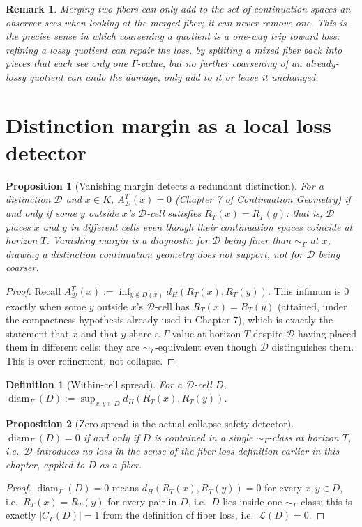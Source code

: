 \documentclass[11pt]{report}
\newtheorem{proposition}{Proposition}[chapter]
\newtheorem{definition}{Definition}[chapter]
\newtheorem{remark}{Remark}[chapter]
\begin{document}
\begin{remark}
Merging two fibers can only add to the set of continuation spaces an
observer sees when looking at the merged fiber; it can never remove
one. This is the precise sense in which coarsening a quotient is a
one-way trip toward loss: refining a lossy quotient can repair the
loss, by splitting a mixed fiber back into pieces that each see only
one $\Gamma$-value, but no further coarsening of an already-lossy
quotient can undo the damage, only add to it or leave it unchanged.
\end{remark}

\section*{Distinction margin as a local loss detector}

\begin{proposition}[Vanishing margin detects a redundant distinction]
For a distinction $\mathcal{D}$ and $x \in K$, $A_{\mathcal D}^T(x) = 0$
(Chapter 7 of \emph{Continuation Geometry}) if and only if some $y$
outside $x$'s $\mathcal{D}$-cell satisfies $R_T(x) = R_T(y)$: that is,
$\mathcal{D}$ places $x$ and $y$ in different cells even though their
continuation spaces coincide at horizon $T$. Vanishing margin is a
diagnostic for $\mathcal{D}$ being \emph{finer} than $\sim_\Gamma$ at
$x$, drawing a distinction continuation geometry does not support, not
for $\mathcal{D}$ being coarser.
\end{proposition}
\begin{proof}
Recall $A_{\mathcal D}^T(x) := \inf_{y \notin D(x)} d_H(R_T(x), R_T(y))$.
This infimum is $0$ exactly when some $y$ outside $x$'s
$\mathcal{D}$-cell has $R_T(x) = R_T(y)$ (attained, under the
compactness hypothesis already used in Chapter 7), which is exactly
the statement that $x$ and that $y$ share a $\Gamma$-value at horizon
$T$ despite $\mathcal D$ having placed them in different cells: they
are $\sim_\Gamma$-equivalent even though $\mathcal D$ distinguishes
them. This is over-refinement, not collapse.
\end{proof}

\begin{definition}[Within-cell spread]
For a $\mathcal{D}$-cell $D$, $\operatorname{diam}_\Gamma(D) :=
\sup_{x,y \in D} d_H(R_T(x), R_T(y))$.
\end{definition}

\begin{proposition}[Zero spread is the actual collapse-safety detector]
\label{prop:diamzero}
$\operatorname{diam}_\Gamma(D) = 0$ if and only if $D$ is contained in
a single $\sim_\Gamma$-class at horizon $T$, i.e.\ $\mathcal{D}$
introduces no loss in the sense of the fiber-loss definition earlier
in this chapter, applied to $D$ as a fiber.
\end{proposition}
\begin{proof}
$\operatorname{diam}_\Gamma(D) = 0$ means $d_H(R_T(x),R_T(y)) = 0$ for
every $x,y \in D$, i.e.\ $R_T(x) = R_T(y)$ for every pair in $D$, i.e.\
$D$ lies inside one $\sim_\Gamma$-class; this is exactly
$|C_\Gamma(D)| = 1$ from the definition of fiber loss, i.e.\
$\mathcal{L}(D) = 0$.
\end{proof}
\end{document}
